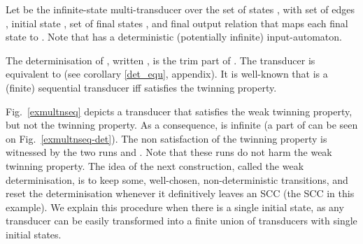 \documentclass[envcountsame]{llncs}
\begin{document}
Let  be the infinite-state multi-transducer
over the set of states , with set of
edges ,  initial state , set of final states , and final output relation that maps each final state  to .
Note that  has a deterministic (potentially
infinite) input-automaton.

The determinisation of , written , is the trim part of .
The transducer  is equivalent to  (see corollary \ref{det_equ}, appendix).
It is
well-known that  is a (finite) sequential
transducer iff  satisfies the twinning property. 




Fig.~\ref{exmultnseq} depicts a transducer that satisfies the weak twinning
property, but not the twinning property. As a consequence,
 is infinite (a part of  can be
seen on Fig.~\ref{exmultnseq-det}). The non satisfaction of the
twinning property is witnessed by the two runs  and . Note that these runs do not harm the weak
twinning property. The idea of the next construction,
called the weak determinisation, is to keep some, well-chosen, non-deterministic
transitions, and reset the determinisation whenever
it definitively leaves an SCC (the SCC  in this
example). We explain this procedure when there is a single initial
state, as any transducer can be easily transformed into a finite
union of transducers with single initial states.
\end{document}
